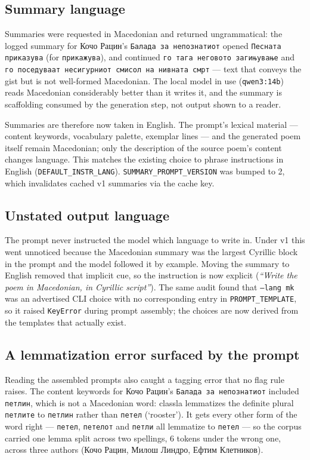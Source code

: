 \documentclass[11pt]{article}
\begin{document}
\subsection{Summary language}

Summaries were requested in Macedonian and returned ungrammatical: the logged
summary for Кочо Рацин's \texttt{Балада за непознатиот} opened
\texttt{Песната приказува} (for \texttt{прикажува}), and continued
\texttt{го тага неговото загињување} and \texttt{го поседуваат несигурниот
смисол на нивната смрт} — text that conveys the gist but is not well-formed
Macedonian. The local model in use (\texttt{qwen3:14b}) reads Macedonian
considerably better than it writes it, and the summary is scaffolding
consumed by the generation step, not output shown to a reader.

Summaries are therefore now taken in English. The prompt's lexical material —
content keywords, vocabulary palette, exemplar lines — and the generated poem
itself remain Macedonian; only the description of the source poem's content
changes language. This matches the existing choice to phrase instructions in
English (\texttt{DEFAULT\_INSTR\_LANG}). \texttt{SUMMARY\_PROMPT\_VERSION} was
bumped to 2, which invalidates cached v1 summaries via the cache key.

\subsection{Unstated output language}

The prompt never instructed the model which language to write in. Under v1
this went unnoticed because the Macedonian summary was the largest
Cyrillic block in the prompt and the model followed it by example. Moving the
summary to English removed that implicit cue, so the instruction is now
explicit (\emph{``Write the poem in Macedonian, in Cyrillic script''}). The
same audit found that \texttt{--lang mk} was an advertised CLI choice with no
corresponding entry in \texttt{PROMPT\_TEMPLATE}, so it raised
\texttt{KeyError} during prompt assembly; the choices are now derived from the
templates that actually exist.

\subsection{A lemmatization error surfaced by the prompt}

Reading the assembled prompts also caught a tagging error that no flag rule
raises. The content keywords for Кочо Рацин's \texttt{Балада за непознатиот}
included \texttt{петлин}, which is not a Macedonian word: classla lemmatizes
the definite plural \texttt{петлите} to \texttt{петлин} rather than
\texttt{петел} (`rooster'). It gets every other form of the word right —
\texttt{петел}, \texttt{петелот} and \texttt{петли} all lemmatize to
\texttt{петел} — so the corpus carried one lemma split across two spellings,
6 tokens under the wrong one, across three authors (Кочо Рацин, Милош Линдро,
Ефтим Клетников).
\end{document}
